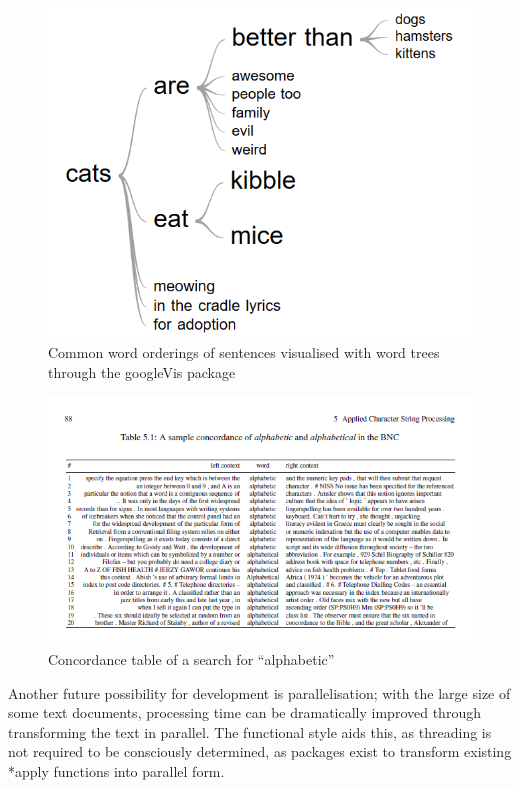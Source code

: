 \documentclass[11pt, a4paper, titlepage]{report}
\begin{document}
\begin{figure}
  \centering \includegraphics[scale=0.5]{gvis.png}
  \caption{Common word orderings of sentences visualised with word
    trees through the googleVis package\label{fig:gvis}}
\end{figure}

\begin{figure}
  \centering \includegraphics[scale=0.6]{concordance.png}
  \caption{Concordance table of a search for ``alphabetic''\autocite{desagulier17:_corpus_linguis_statis_r}\label{fig:concordance}}
\end{figure}

Another future possibility for development is parallelisation; with
the large size of some text documents, processing time can be
dramatically improved through transforming the text in parallel. The
functional style aids this, as threading is not required to be
consciously determined, as packages exist to transform existing *apply
functions into parallel form.
\end{document}
